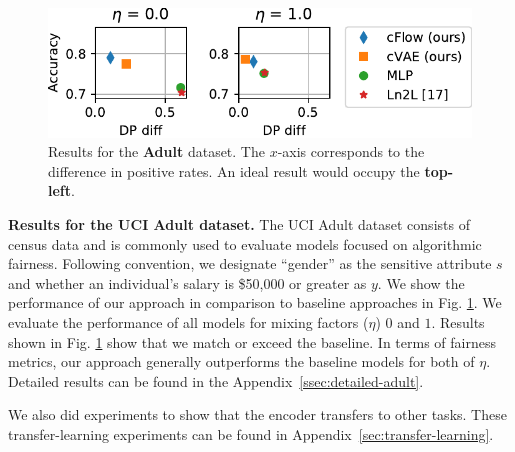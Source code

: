 \begin{figure}[t]
  \centering
  \includegraphics[width=\linewidth]{./Figures/nosinn_adult_multiplot_mini_diff.pdf}
  \caption{
      Results for the \textbf{Adult} dataset.
      The $x$-axis corresponds to the difference in positive rates.
      An ideal result would occupy the \textbf{top-left}.
  }%
  \label{fig:adult-chart}
\end{figure}
%
\noindent\textbf{Results for the UCI Adult dataset.}
The UCI Adult dataset consists of census data and is commonly used to evaluate models focused on algorithmic fairness.
Following convention, we designate ``gender'' as the sensitive attribute $s$ and whether an individual's salary is \$50,000 or greater as $y$.
We show the performance of our approach in comparison to baseline approaches in Fig. \ref{fig:adult-chart}.
We evaluate the performance of all models for mixing factors ($\eta$) $0$ and $1$. 
Results shown in Fig. \ref{fig:adult-chart} show that
we match or exceed the baseline.
In terms of fairness metrics, our approach generally outperforms the baseline models for both of $\eta$.
Detailed results can be found in the Appendix~\ref{ssec:detailed-adult}.

We also did experiments to show that the encoder transfers to other tasks. These transfer-learning experiments can be found in Appendix~\ref{sec:transfer-learning}.


